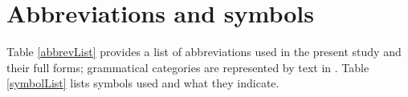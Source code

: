 %


\chapter*{Abbreviations and symbols}\label{abbreviations}
Table \vref{abbrevList} provides a list of abbreviations used in the present study and their full forms; grammatical categories are represented by text in . 
Table \ref{symbolList} lists symbols used and what they indicate. 

